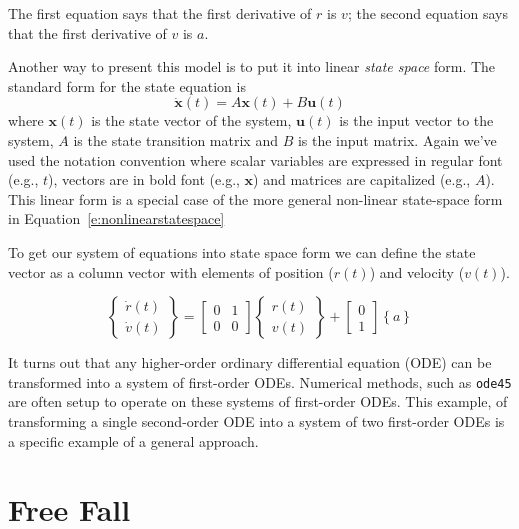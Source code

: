 \documentclass[../../book.tex]{subfiles}
\begin{document}
The first equation says that the first derivative of $r$ is $v$;
the second equation says that the first derivative of $v$ is $a$.

Another way to present this model is to put it into linear \emph{state space} form.  The standard form for the state equation is
\begin{equation} \label{e:statespace}
    \dot{\mathbf{x}}(t) = A \mathbf{x}(t) + B \mathbf{u}(t) 
\end{equation}
where $\mathbf{x}(t)$ is the state vector of the system, $\mathbf{u}(t)$ is the input vector to the system, $A$ is the state transition matrix and $B$ is the input matrix.  Again we've used the notation convention where scalar variables are expressed in regular font (e.g., $t$), vectors are in bold font (e.g., $\mathbf{x}$) and matrices are capitalized (e.g., $A$).  This linear form is a special case of the more general non-linear state-space form in Equation~\ref{e:nonlinearstatespace}

To get our system of equations into state space form we can define the state vector as a column vector with elements of position ($r(t)$) and velocity ($v(t)$).

\begin{equation}
\left\lbrace
\begin{array}{c}
    \dot{r}(t) \\
    \dot{v}(t)
\end{array}
\right\rbrace
=
\left[ \begin{array}{cc}
0 & 1 \\
0 & 0 
\end{array} \right]
\left\{ \begin{array}{c}
    r(t) \\ v(t)
\end{array} \right\}
+ 
\left[ \begin{array}{c}
    0 \\ 1
\end{array} \right]
\left\{ a \right\}
\end{equation}

It turns out that any higher-order ordinary differential equation (ODE) can be transformed into a system of first-order ODEs. Numerical methods, such as \lstinline{ode45} are often setup to operate on these systems of first-order ODEs.  This example, of transforming a single second-order ODE into a system of two first-order ODEs is a specific example of a general approach.

\section{Free Fall}
\label{freefall}
\end{document}
